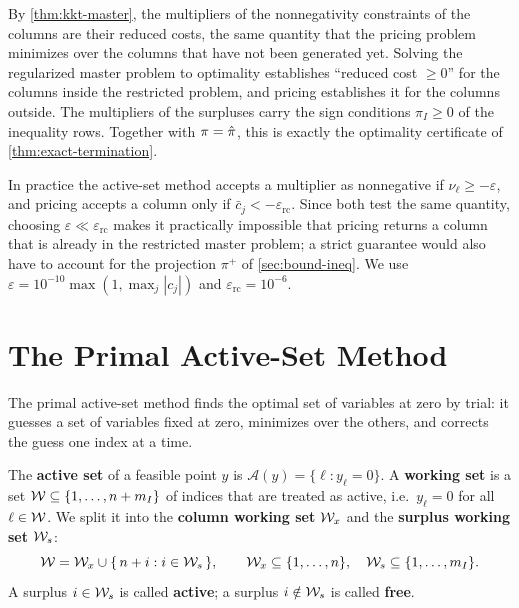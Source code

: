 \begin{remark} \label{rem:same-test}
By \cref{thm:kkt-master}, the multipliers of the nonnegativity constraints of the columns
are their reduced costs, the same quantity that the pricing problem minimizes over the
columns that have not been generated yet. Solving the regularized master problem to
optimality establishes ``reduced cost $\ge0$'' for the columns inside the restricted problem,
and pricing establishes it for the columns outside. The multipliers of the surpluses carry
the sign conditions $\pi_I\ge0$ of the inequality rows. Together with $\pi=\hat{\pi}$,
this is exactly the optimality certificate of \cref{thm:exact-termination}.
\end{remark}

\begin{remark} \label{rem:tolerances}
In practice the active-set method accepts a multiplier as nonnegative if
$\nu_\ell\ge-\varepsilon$, and pricing accepts a column only if $\bar c_j<-\varepsilon_{\mathrm{rc}}$.
Since both test the same quantity, choosing $\varepsilon\ll\varepsilon_{\mathrm{rc}}$ makes it
practically impossible that pricing returns a column that is already in the restricted master
problem; a strict guarantee would also have to account for the projection $\pi^+$ of
\cref{sec:bound-ineq}. We use $\varepsilon = 10^{-10}\max(1,\max_j|c_j|)$ and
$\varepsilon_{\mathrm{rc}} = 10^{-6}$.
\end{remark}


\section{The Primal Active-Set Method}
\label{sec:active-set}

The primal active-set method finds the optimal set of variables at zero by trial: it guesses a
set of variables fixed at zero, minimizes over the others, and corrects the guess one index at
a time.

\begin{definition} \label{def:working-set}
The \textbf{active set} of a feasible point $y$ is
$\mathcal{A}(y) = \{\ell : y_\ell = 0\}$. A \textbf{working set} is a set
$\mathcal{W}\subseteq\{1,\dots,n+m_I\}$ of indices that are treated as active, i.e.\ $y_\ell = 0$
for all $\ell\in\mathcal{W}$. We split it into the \textbf{column working set} $\mathcal{W}_x$ and the
\textbf{surplus working set} $\mathcal{W}_s$:
\[
\mathcal{W} = \mathcal{W}_x\cup\{\,n+i : i\in\mathcal{W}_s\,\},\qquad \mathcal{W}_x\subseteq\{1,\dots,n\},\quad
\mathcal{W}_s\subseteq\{1,\dots,m_I\} .
\]
A surplus $i\in\mathcal{W}_s$ is called \textbf{active}; a surplus $i\notin\mathcal{W}_s$ is called
\textbf{free}.
\end{definition}

